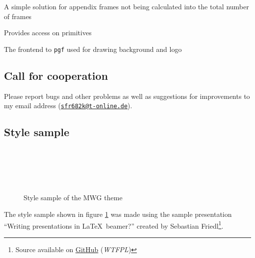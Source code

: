 \documentclass[11pt]{ltxdoc}
\begin{document}
	\medskip
	A simple solution for appendix frames not being calculated into the total number of frames
	
	\medskip
	Provides access on  primitives
	
    \medskip
    The frontend to \texttt{pgf} used for drawing background and logo
	
	
	\subsection*{Call for cooperation}
	Please report bugs and other problems as well as suggestions for improvements to my email address (\href{mailto:sfr682k@t-online.de}{\texttt{sfr682k@t-online.de}}).
	
	
	\subsection*{Style sample}
	\begin{figure} \centering
		~~~ \\[.5em]
		~~~ \\[.5em]
		~~~ \\[.5em]
		~~~
		
		\caption{Style sample of the MWG theme}
		\label{stylesample}
	\end{figure}
	
	The style sample shown in figure \ref{stylesample} was made using the sample presentation \enquote{Writing presentations in \LaTeX\ beamer?} created by Sebastian Friedl\footnote{Source available on \href{https://github.com/SFr682k/sample-latex-beamer-presentation}{GitHub} (\textit{WTFPL})}.
	
	
\end{document}
